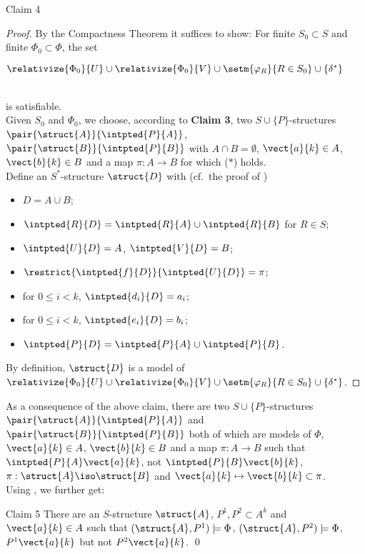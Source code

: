 \begin{enumerate}[1.]
\begin{theorem}{Claim 4}
\end{theorem}
\begin{proof}
By the Compactness Theorem it suffices to show: For finite $S_0 \subset S$ and finite $\Phi_0 \subset \Phi$, the set\smallskip\\
\centerline{$\relativize{\Phi_0}{U} \cup \relativize{\Phi_0}{V} \cup \setm{\varphi_R}{R \in S_0} \cup \{ \delta^\ast \}$}\smallskip\\
is satisfiable.\bigskip\\
Given $S_0$ and $\Phi_0$, we choose, according to \textbf{Claim 3}, two $S \cup \{ P \}$-structures $\pair{\struct{A}}{\intpted{P}{A}}$, $\pair{\struct{B}}{\intpted{P}{B}}$ with $A \cap B = \emptyset$, $\vect{a}{k} \in A$, $\vect{b}{k} \in B$ and a map $\pi : A \to B$ for which ($\ast$) holds.\bigskip\\
Define an $S^\ast$-structure $\struct{D}$ with (cf.\ the proof of )
\begin{itemize}
\item $D = A \cup B$;
\item $\intpted{R}{D} = \intpted{R}{A} \cup \intpted{R}{B}$ for $R \in S$;
\item $\intpted{U}{D} = A$, $\intpted{V}{D} = B$;
\item $\restrict{\intpted{f}{D}}{\intpted{U}{D}} = \pi$;
\item for $0 \leq i < k$, $\intpted{d_i}{D} = a_i$;
\item for $0 \leq i < k$, $\intpted{e_i}{D} = b_i$;
\item $\intpted{P}{D} = \intpted{P}{A} \cup \intpted{P}{B}$.
\end{itemize}
By definition, $\struct{D}$ is a model of $\relativize{\Phi_0}{U} \cup \relativize{\Phi_0}{V} \cup \setm{\varphi_R}{R \in S_0} \cup \{ \delta^\ast \}$.
\end{proof}
As a consequence of the above claim, there are two $S \cup \{ P \}$-structures $\pair{\struct{A}}{\intpted{P}{A}}$ and $\pair{\struct{B}}{\intpted{P}{B}}$ both of which are models of $\Phi$, $\vect{a}{k} \in A$, $\vect{b}{k} \in B$ and a map $\pi: A \to B$ such that $\intpted{P}{A}\vect{a}{k}$, not $\intpted{P}{B}\vect{b}{k}$, $\pi: \struct{A} \iso \struct{B}$ and $\vect{a}{k} \mapsto \vect{b}{k} \subset \pi$.\bigskip\\
Using , we further get:\medskip\\
\begin{theorem}{Claim 5}
There are an $S$-structure $\struct{A}$, $P^1, P^2 \subset A^k$ and $\vect{a}{k} \in A$ such that $(\struct{A}, P^1) \models \Phi$, $(\struct{A}, P^2) \models \Phi$, $P^1\vect{a}{k}$ but not $P^2\vect{a}{k}$. \qed

\end{theorem}
\end{enumerate}

